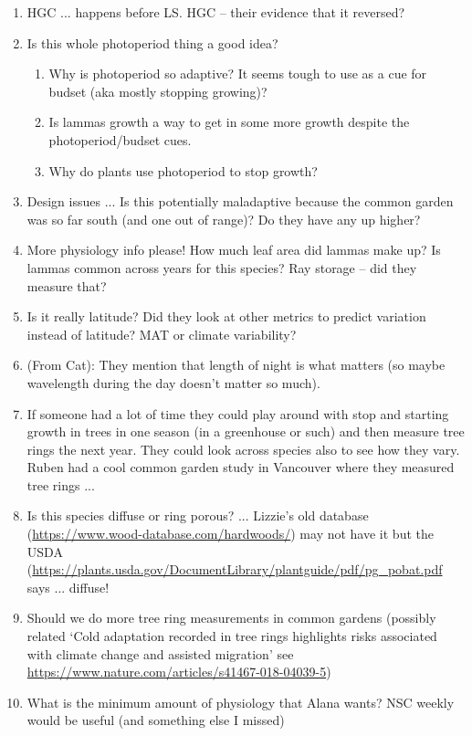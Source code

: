 \documentclass[11pt,letter]{article}
\begin{document}
\begin{enumerate}
\begin{enumerate}
\item HGC ... happens before LS. HGC -- their evidence that it reversed?
\item Is this whole photoperiod thing a good idea?
\begin{enumerate}
\item Why is photoperiod so adaptive? It seems tough to use as a cue for budset (aka mostly stopping growing)?
\item Is lammas growth a way to get in some more growth despite the photoperiod/budset cues. 
\item Why do plants use photoperiod to stop growth?
\end{enumerate}
\item Design issues ... Is this potentially maladaptive because the common garden was so far south (and one out of range)? Do they have any up higher?
\item More physiology info please! How much leaf area did lammas make up? Is lammas common across years for this species? Ray storage -- did they measure that?
\item Is it really latitude? Did they look at other metrics to predict variation instead of latitude? MAT or climate variability?
\item (From Cat): They mention that length of night is what matters (so maybe wavelength during the day doesn't matter so much).
\item If someone had a lot of time they could play around with stop and starting growth in trees in one season (in a greenhouse or such) and then measure tree rings the next year. They could look across species also to see how they vary. Ruben had a cool common garden study in Vancouver where they measured tree rings ... 
\item Is this species diffuse or ring porous?  ... Lizzie's old database (\url{https://www.wood-database.com/hardwoods/}) may not have it but the USDA (\url{https://plants.usda.gov/DocumentLibrary/plantguide/pdf/pg_pobat.pdf} says ... diffuse!
\item Should we do more tree ring measurements in common gardens (possibly related `Cold adaptation recorded in tree rings highlights risks associated with climate change and assisted migration' see \url{https://www.nature.com/articles/s41467-018-04039-5})
\item What is the minimum amount of physiology that Alana wants? NSC weekly would be useful (and something else I missed)
\end{enumerate}
\end{enumerate}
\end{document}
